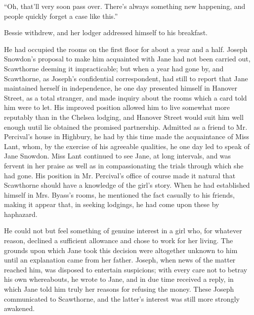 ``Oh, that'll very soon pass over. There's always something new
happening, and people quickly forget a case like this.''

Bessie withdrew, and her lodger addressed himself to his breakfast.

He had occupied the rooms on the first floor for about a year and a
half. Joseph Snowdon's proposal to make him acquainted with Jane had not
been carried out, Scawthorne deeming it impracticable; but when a year
had gone by, and Scawthorne, as Joseph's confidential correspondent, had
still to report that Jane maintained herself in independence, he one day
presented himself in Hanover Street, as a total stranger, and made
inquiry about the rooms which a card told him were to let. His improved
position allowed him to live somewhat more reputably than in the Chelsea
lodging, and Hanover Street would suit him {} well enough uutil lie
obtained the promised partnership. Admitted as a friend to Mr.
Percival's house in Highbury, he had by this time made the acquaintance
of Miss Lant, whom, by the exercise of his agreeable qualities, he one
day led to speak of Jane Snowdon. Miss Lant continued to see Jane, at
long intervals, and was fervent in her praise as well as in
compassionating the trials through which she had gone. His position in
Mr. Percival's office of course made it natural that Scawthorne should
have a knowledge of the girl's story. When he had established himself in
Mrs. Byass's rooms, he mentioned the fact casually to his friends,
making it appear that, in seeking lodgings, he had come upon these by
haphazard.

He could not but feel something of genuine interest in a girl who, for
whatever reason, declined a sufficient allowance and chose to work for
her living. The grounds upon which Jane took this decision were
altogether unknown to him until an explanation came from her father.
Joseph, when news of the matter reached him, was disposed to entertain
suspicions; with every care not to betray his own whereabouts, he wrote
to Jane, and in due {} time received a reply, in which Jane told him
truly her reasons for refusing the money. These Joseph communicated to
Scawthorne, and the latter's interest was still more strongly awakened.

